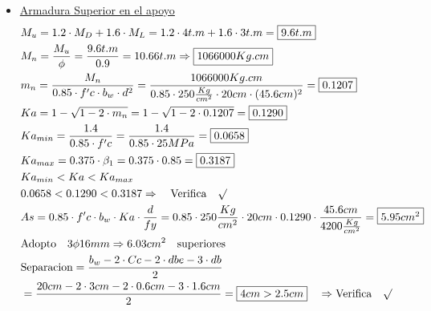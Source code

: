 \begin{enumerate}
\begin{itemize}
\item \underline{Armadura Superior en el apoyo}
\begin{align*}
& M_u = 1.2 \cdot M_D + 1.6 \cdot M_L = 1.2 \cdot 4 t.m + 1.6 \cdot 3 t.m = \framebox{$9.6 t.m$}\\
& M_n = \frac{M_u}{\phi} = \frac{9.6 t.m}{0.9} = 10.66 t.m \Rightarrow \framebox{$1066000 Kg.cm$}\\
& m_n = \frac{M_n}{0.85 \cdot f'c \cdot b_w \cdot d^2} = \frac{1066000 Kg.cm}{0.85 \cdot 250 \frac{Kg}{cm^2} \cdot 20 cm \cdot (45.6cm)^2} = \framebox{0.1207}\\
& Ka = 1- \sqrt{1-2 \cdot m_n} = 1- \sqrt{1-2 \cdot 0.1207} = \framebox{0.1290}\\
& Ka_{min}= \frac{1.4}{0.85 \cdot f'c} = \frac{1.4}{0.85 \cdot 25MPa} = \framebox{0.0658}\\
& Ka_{max}= 0.375 \cdot \beta_1 = 0.375 \cdot 0.85 = \framebox{0.3187}\\
& Ka_{min} < Ka < Ka_{max}\\
& 0.0658 < 0.1290 < 0.3187 \Rightarrow \quad \text{Verifica} \quad \surd\\
& As= 0.85 \cdot f'c \cdot b_w \cdot Ka \cdot \frac{d}{fy} = 0.85 \cdot 250 \frac{Kg}{cm^2} \cdot 20cm \cdot 0.1290 \cdot \frac{45.6cm}{4200 \frac{Kg}{cm^2}} = \framebox{$5.95 cm^2$}\\
& \text{Adopto} \quad 3 \phi 16mm \Rightarrow 6.03cm^2 \quad \text{superiores}\\
& \text{Separacion} = \frac{b_w-2 \cdot Cc - 2 \cdot dbe - 3 \cdot db}{2} \\ 
& = \frac{20cm-2 \cdot 3cm - 2 \cdot 0.6cm - 3 \cdot 1.6cm}{2} = \framebox{$4cm > 2.5 cm$} \quad \Rightarrow \text{Verifica} \quad \surd
\end{align*}


\end{itemize}
\end{enumerate}
